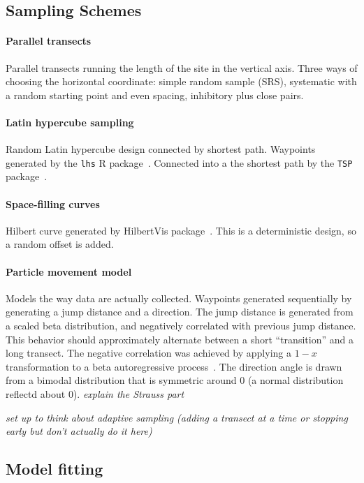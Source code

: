 \documentclass[review]{elsarticle}
\begin{document}
\subsection{Sampling Schemes}

\paragraph{Parallel transects} Parallel transects running the length of the
site in the vertical axis. Three ways of choosing the horizontal coordinate:
simple random sample (SRS), systematic with a random starting point and even
spacing, inhibitory plus close pairs.

\paragraph{Latin hypercube sampling}
Random Latin hypercube design connected by shortest path. Waypoints generated
by the \texttt{lhs} R package~\cite{lhs}. Connected into a the shortest path
by the \texttt{TSP} package~\citep{tsp}.

\paragraph{Space-filling curves}
Hilbert curve generated by HilbertVis package~\citep{hilbertvis}. This is a
deterministic design, so a random offset is added.

\paragraph{Particle movement model}
Models the way data are actually collected. Waypoints generated sequentially by
generating a jump distance and a direction. The jump distance is generated from
a scaled beta distribution, and negatively correlated with previous jump
distance. This behavior should approximately alternate between a short
``transition'' and a long transect. The negative correlation was achieved by
applying a \(1 - x\) transformation to a beta autoregressive
process~\citep{mckenzie}. The direction angle is drawn from a bimodal
distribution that is symmetric around 0 (a normal distribution reflectd about
0). {\it explain the Strauss part}

{\it set up to think about adaptive sampling (adding a transect at a time or
stopping early but don't actually do it here)}


\subsection{Model fitting}
\end{document}
